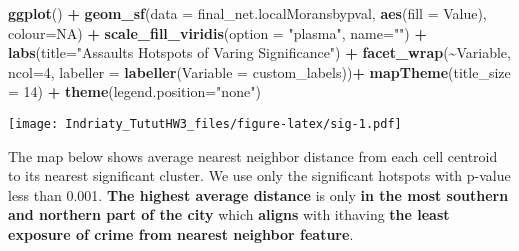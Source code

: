 \documentclass[
]{article}
\newenvironment{Shaded}{\begin{snugshade}}{\end{snugshade}}
\newcommand{\AttributeTok}[1]{\textcolor[rgb]{0.13,0.29,0.53}{#1}}
\newcommand{\ConstantTok}[1]{\textcolor[rgb]{0.56,0.35,0.01}{#1}}
\newcommand{\DecValTok}[1]{\textcolor[rgb]{0.00,0.00,0.81}{#1}}
\newcommand{\FunctionTok}[1]{\textcolor[rgb]{0.13,0.29,0.53}{\textbf{#1}}}
\newcommand{\NormalTok}[1]{#1}
\newcommand{\SpecialCharTok}[1]{\textcolor[rgb]{0.81,0.36,0.00}{\textbf{#1}}}
\newcommand{\StringTok}[1]{\textcolor[rgb]{0.31,0.60,0.02}{#1}}
\begin{document}
\begin{Shaded}
\begin{Highlighting}[]
\FunctionTok{ggplot}\NormalTok{() }\SpecialCharTok{+}
      \FunctionTok{geom\_sf}\NormalTok{(}\AttributeTok{data =}\NormalTok{ final\_net.localMoransbypval, }
              \FunctionTok{aes}\NormalTok{(}\AttributeTok{fill =}\NormalTok{ Value), }\AttributeTok{colour=}\ConstantTok{NA}\NormalTok{) }\SpecialCharTok{+}
      \FunctionTok{scale\_fill\_viridis}\NormalTok{(}\AttributeTok{option =} \StringTok{"plasma"}\NormalTok{, }\AttributeTok{name=}\StringTok{""}\NormalTok{) }\SpecialCharTok{+}
      \FunctionTok{labs}\NormalTok{(}\AttributeTok{title=}\StringTok{"Assaults Hotspots of Varing Significance"}\NormalTok{) }\SpecialCharTok{+}
      \FunctionTok{facet\_wrap}\NormalTok{(}\SpecialCharTok{\textasciitilde{}}\NormalTok{Variable, }\AttributeTok{ncol=}\DecValTok{4}\NormalTok{, }\AttributeTok{labeller =} \FunctionTok{labeller}\NormalTok{(}\AttributeTok{Variable =}\NormalTok{ custom\_labels))}\SpecialCharTok{+}
      \FunctionTok{mapTheme}\NormalTok{(}\AttributeTok{title\_size =} \DecValTok{14}\NormalTok{) }\SpecialCharTok{+} \FunctionTok{theme}\NormalTok{(}\AttributeTok{legend.position=}\StringTok{"none"}\NormalTok{)}
\end{Highlighting}
\end{Shaded}

\texttt{[image: Indriaty\_TututHW3\_files/figure-latex/sig-1.pdf]}

The map below shows average nearest neighbor distance from each cell
centroid to its nearest significant cluster. We use only the significant
hotspots with p-value less than 0.001. \textbf{The highest average
distance} is only \textbf{in the most southern and northern part of the
city} which \textbf{aligns} with ithaving \textbf{the least exposure of
crime from nearest neighbor feature}.
\end{document}
